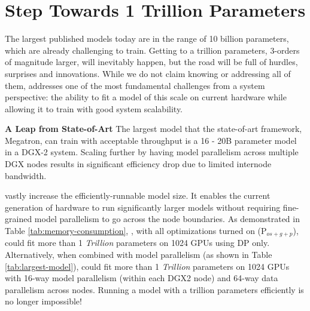 \section{Step Towards 1 Trillion Parameters}
The largest published models today are in the range of 10 billion parameters, which are already challenging to train.  Getting to a trillion parameters,  3-orders of magnitude larger, will inevitably happen, but the road will be full of hurdles, surprises and innovations. While we do not claim knowing or addressing all of them, \name addresses one of the most fundamental challenges from a system perspective: the ability to fit a model of this scale on current hardware while allowing it to train with good system scalability.

\textbf{A Leap from State-of-Art}  
The largest model that the state-of-art framework, Megatron, can train with acceptable throughput is a 16 - 20B parameter model in a DGX-2 system. Scaling further by having model parallelism across multiple DGX nodes results in significant efficiency drop due to limited internode bandwidth.  

\name vastly increase the efficiently-runnable model size.  It enables the current generation of hardware to run significantly larger models without requiring fine-grained model parallelism to go across the node boundaries.
As demonstrated in Table \ref{tab:memory-consumption}, \name, with all optimizations turned on (P$_{os+g+p}$), could fit more than 1 \emph{Trillion} parameters on 1024 GPUs using DP only.  Alternatively, when combined with model parallelism (as shown in Table \ref{tab:largest-model}), \name could fit more than 1 \emph{Trillion} parameters on 1024 GPUs with 16-way model parallelism (within each DGX2 node) and 64-way data parallelism across nodes.  Running a model with a trillion parameters efficiently is no longer impossible!

 


